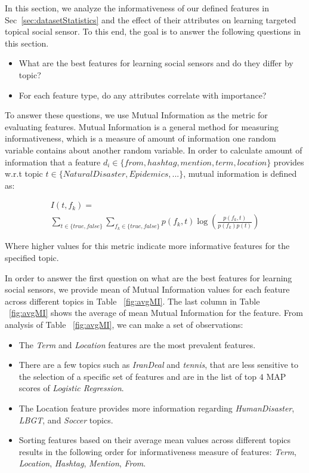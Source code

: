 In this section, we analyze the informativeness of our defined features in Sec~\ref{sec:datasetStatistics} and the effect of their attributes on learning targeted topical social sensor. To this end, the goal is to answer the following questions in this section.

\begin{itemize}
\item What are the best features for learning social sensors and do they differ by topic?
\item For each feature type, do any attributes correlate with importance?
\end{itemize}

To answer these questions, we use Mutual Information as the metric for evaluating features. Mutual Information is a general method for measuring informativeness, which is a measure of amount of information one random variable contains about another random variable. In order to calculate amount of information that a feature $d_{i} \in \{from, hashtag, mention, term, location\}$ provides w.r.t topic $t \in \{NaturalDisaster, Epidemics, ...\}$, mutual information is defined as:

\begin{multline}
I(t, f_k)= \\
 \sum_{t \in \{ true, false \}} \sum_{f_k\in \{ true, false\}}p(f_k,t)\log \left ( \frac{p(f_k,t)}{p(f_k)p(t)} \right )
 \label{eq:eq1}
\end{multline}

Where higher values for this metric indicate more informative features for the specified topic.

In order to answer the first question on what are the best features for learning social sensors, we provide mean of Mutual Information values for each feature across different topics in Table ~\ref{fig:avgMI}. The last column in Table ~\ref{fig:avgMI} shows the average of mean Mutual Information for the feature. From analysis of Table ~\ref{fig:avgMI}, we can make a set of observations:

\begin{itemize}
\item The \textit{Term} and \textit{Location} features are the most prevalent features.%
\item There are a few topics such as \textit{IranDeal} and \textit{tennis}, that are less sensitive to the selection of a specific set of features and are in the list of top $4$ MAP scores of \textit{Logistic Regression}.%
\item The Location feature provides more information regarding \textit{HumanDisaster}, \textit{LBGT}, and \textit{Soccer} topics.
\item Sorting features based on their average mean values across different topics results in the following order for informativeness measure of features: \textit{Term}, \textit{Location}, \textit{Hashtag}, \textit{Mention}, \textit{From}.
\end{itemize}

